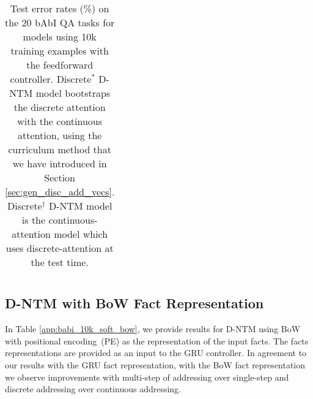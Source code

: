 \documentclass[12pt]{article}
\begin{document}
\begin{table*}[htbp]
\begin{tabular}{ | l || c |c | c | c | c |}
\end{tabular}
\caption{Test error rates (\%) on the 20 bAbI QA tasks for models using 10k training examples with the feedforward controller. Discrete$^{\ast}$ D-NTM model bootstraps the discrete attention with the continuous attention, using the curriculum method that we have introduced in Section \ref{sec:gen_disc_add_vecs}. Discrete$^{\dagger}$ D-NTM model is the continuous-attention model which uses discrete-attention at the test time.}
\label{app:babi_10k_soft_ff_hard_test}
\end{table*}

\subsection{D-NTM with BoW Fact Representation}
In Table \ref{app:babi_10k_soft_bow}, we provide results for D-NTM using BoW with positional encoding~(PE) \cite{sukhbaatarend} as the representation of the input facts. The facts representations are provided as an input to the GRU controller. In agreement to our results with the 
GRU fact representation, with the BoW fact representation we observe improvements with multi-step of addressing over single-step and discrete addressing over continuous addressing.
\end{document}

